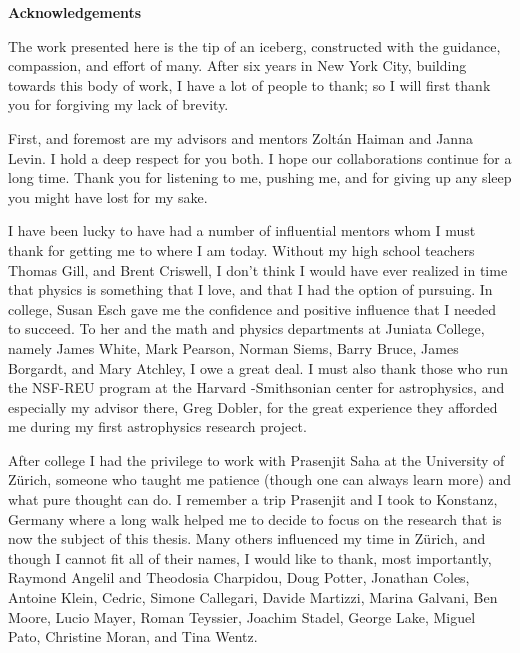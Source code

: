 \newpage

\begin{center}
    {\large \bf Acknowledgements }
\end{center}

\vspace{-0.2cm}


The work presented here is the tip of an iceberg, constructed with the
guidance, compassion, and effort of many. After six years in New York City,
building towards this body of work, I have a lot of people to thank; so
I will first thank you for forgiving my lack of brevity.


First, and foremost are my advisors and mentors Zolt\'an Haiman and Janna
Levin. I hold a deep respect for you both. I hope our collaborations continue
for a long time. Thank you for listening to me, pushing me, and for giving up
any sleep you might have lost for my sake.



I have been lucky to have had a number of influential mentors whom I must thank for
getting me to where I am today. Without my high school teachers Thomas Gill,
and Brent Criswell, I don't think I would have ever realized in time that
physics is something that I love, and that I had the option of pursuing. In
college, Susan Esch gave me the confidence and positive influence that I
needed to succeed. To her and the math and physics departments at Juniata
College, namely James White, Mark Pearson, Norman Siems,
Barry Bruce, James Borgardt, and Mary Atchley, I owe a great deal. I must also 
thank those who run the NSF-REU program at the Harvard -Smithsonian center for astrophysics, 
and especially my advisor there, Greg Dobler, for the great experience they afforded me during my
first astrophysics research project.


After college I had the privilege to work with Prasenjit Saha at the
University of Z\"urich, someone who taught me patience (though one can always
learn more) and what pure thought can do. I remember a trip Prasenjit and
I took to Konstanz, Germany where a long walk helped me to decide to focus on
the research that is now the subject of this thesis. Many others influenced my time
in Z\"urich, and though I cannot fit all of their names, I would like to
thank, most importantly, Raymond Angelil and Theodosia Charpidou, 
Doug Potter, Jonathan Coles,
Antoine Klein, Cedric, Simone Callegari, Davide Martizzi, Marina
Galvani, Ben Moore, Lucio Mayer, Roman Teyssier, Joachim
Stadel, George Lake, Miguel Pato, Christine Moran, and Tina Wentz.

